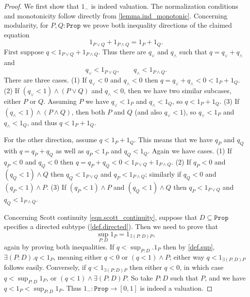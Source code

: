 \documentclass[11pt, oneside, article]{memoir}
\theoremstyle{plain}
\theoremstyle{definition}
\theoremstyle{remark}
\renewcommand{\ss}{\subseteq}
\newcommand{\const}[1]{\mathtt{#1}}
\newcommand{\ind}[1]{1_{#1}}
\newcommand{\inc}{\ind{-}}				%
\newcommand{\prop}{\const{Prop}}
\begin{document}
\begin{proof}
	We first show that $\inc$ is indeed valuation. The normalization conditions and monotonicity follow directly from \cref{lemma.ind_monotonic}. 	Concerning modularity, for $P,Q : \prop$ we prove both inequality directions of the claimed equation
	\[
		\ind{P \lor Q} + \ind{P \land Q} = \ind P + \ind Q.
	\]
	First suppose $q < \ind{P \lor Q} + \ind{P \land Q}$. Thus there are $q_\lor$ and $q_\land$ such that $q = q_\lor + q_\land$ and
	\[
		q_\lor < \ind{P \lor Q}, \qquad q_\land < \ind{P \land Q}.
	\]
	There are three cases. (1) If $q_\vee<0$ and $q_\wedge<0$ then $q=q_\vee+q_\wedge<0<\ind P + \ind Q$. (2) If  $(q_\vee<1)\wedge(P\vee Q)$ and $q_\wedge<0$, then we have two similar subcases, either $P$ or $Q$. Assuming $P$ we have $q_\vee<\ind P$ and $q_\wedge<\ind Q$, so $q<\ind P+\ind Q$. (3) If $(q_\wedge<1)\wedge(P\wedge Q)$, then both $P$ and $Q$ (and also $q_\vee<1$), so $q_\vee<\ind P$ and $q_\wedge<\ind Q$, and thus $q<\ind P + \ind Q$.
	
	For the other direction, assume $q < \ind{P} + \ind{Q}$. This means that we have $q_P$ and $q_Q$ with $q = q_P + q_Q$ as well as $q_P < \ind{P}$ and $q_Q < \ind{Q}$. Again we have cases. (1) If $q_P<0$ and $q_Q<0$ then $q=q_P + q_Q<0<\ind{P \lor Q} + \ind{P \land Q}$. (2) If $q_P<0$ and $(q_Q<1)\wedge Q$ then $q_Q<\ind{P\vee Q}$ and $q_P<\ind{P\wedge Q}$; similarly if $q_Q<0$ and $(q_P<1)\wedge P$. (3) If $(q_P<1)\wedge P$ and $(q_Q<1)\wedge Q$ then $q_P<\ind{P\vee Q}$ and $q_Q<\ind{P\wedge Q}$.
	
	

	Concerning Scott continuity \eqref{eqn.scott_continuity}, suppose that $D \ss \prop$ specifies a directed subtype (\cref{def.directed}). Then we need to prove that
	\[
		\sup_{P : D} \ind{P} = \ind{\exists (P:D) P},
	\]
	again by proving both inequalities. If $q<\sup_{P : D}. \ind{P}$ then by \cref{def.sup}, $\exists(P:D).q<\ind{P}$, meaning either $q<0$ or $(q<1)\wedge P$; either way $q<\ind{\exists (P:D) P}$ follows easily. Conversely, if $q<\ind{\exists (P:D) P}$ then either $q<0$, in which case $q<\sup_{P : D} \ind{P}$, or $(q<1)\wedge\exists (P:D) P$. So take $P:D$ such that $P$, and we have $q<\ind{P}<\sup_{P:D}\ind P$. Thus $\inc : \prop \to [0,1]$ is indeed a valuation.
\end{proof}
\end{document}
